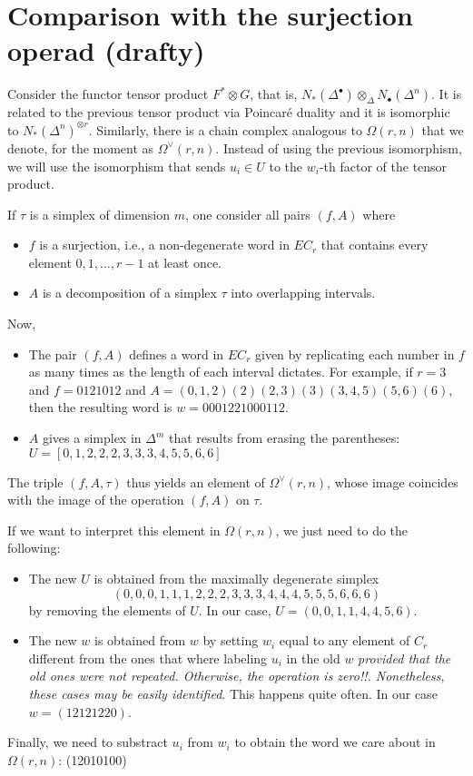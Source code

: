 
\section{Comparison with the surjection operad (drafty)}

Consider the functor tensor product $F^*\otimes G$, that is, $N_*(\Delta^\bullet)\otimes_\Delta N_\bullet(\Delta^n)$. It is related to the previous tensor product via Poincaré duality and it is isomorphic to $N_*(\Delta^n)^{\otimes r}$. Similarly, there is a chain complex analogous to $\Omega(r,n)$ that we denote, for the moment as $\Omega^\vee(r,n)$. Instead of using the previous isomorphism, we will use the isomorphism that sends $u_i\in U$ to the $w_i$-th factor of the tensor product.

If $\tau$ is a simplex of dimension $m$, one consider all pairs $(f,A)$ where
\begin{itemize}
	\item $f$ is a surjection, i.e., a non-degenerate word in $EC_r$ that contains every element $0,1,\ldots,r-1$ at least once.
	\item $A$ is a decomposition of a simplex $\tau$ into overlapping intervals.
\end{itemize}
Now,
\begin{itemize}
	\item The pair $(f,A)$ defines a word in $EC_r$ given by replicating each number in $f$ as many times as the length of each interval dictates. For example, if $r=3$ and $f= 0121012$ and $A=(0,1,2)(2)(2,3)(3)(3,4,5)(5,6)(6)$, then the resulting word is $w=0001221000112$.
	\item $A$ gives a simplex in $\Delta^m$ that results from erasing the parentheses: $U=[0,1,2,2,2,3,3,3,4,5,5,6,6]$
\end{itemize}
The triple $(f,A,\tau)$ thus yields an element of $\Omega^\vee(r,n)$, whose image coincides with the image of the operation $(f,A)$ on $\tau$.

If we want to interpret this element in $\Omega(r,n)$, we just need to do the following:
\begin{itemize}
	\item The new $U$ is obtained from the maximally degenerate simplex \[(0,0,0,1,1,1,2,2,2,3,3,3,4,4,4,5,5,5,6,6,6)\] by removing the elements of $U$. In our case, $U=(0,0,1,1,4,4,5,6)$.
	\item The new $w$ is obtained from $w$ by setting $w_i$ equal to any element of $C_r$ different from the ones that where labeling $u_i$ in the old $w$ \emph{provided that the old ones were not repeated. Otherwise, the operation is zero!!. Nonetheless, these cases may be easily identified}. This happens quite often. In our case $w=(12121220)$.
\end{itemize}
Finally, we need to substract $u_i$ from $w_i$ to obtain the word we care about in $\Omega(r,n)$: (12010100)

